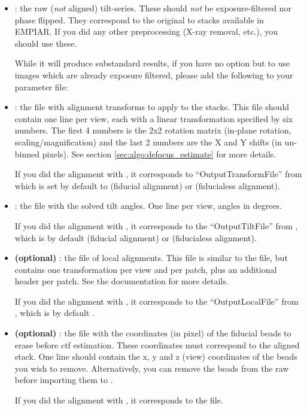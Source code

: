 \begin{itemize}
    \item {}: the raw (\textit{not} aligned) tilt-series. These should \textit{not} be exposure-filtered nor phase flipped. They correspond to the original  to  stacks available in EMPIAR. If you did any other preprocessing (X-ray removal, etc.), you should use these.
    
    \begin{note}While it will produce substandard results, if you have no option but to use images which are already exposure filtered, please add the following to your parameter file: 
    \end{note}
    
    \item {}: the file with alignment transforms to apply to the  stacks. This file should contain one line per view, each with a linear transformation specified by six numbers. The first 4 numbers is the 2x2 rotation matrix (in-plane rotation, scaling/magnification) and the last 2 numbers are the X and Y shifts (in un-binned pixels). See section \ref{sec:algo:defocus_estimate} for more details.
    
    If you did the alignment with {\ETomo}, it corresponds to ``OutputTransformFile'' from {\tiltalign} which is set by default to  (fiducial alignment) or  (fiducialess alignment).
    
    \item {}: the file with the solved tilt angles. One line per view, angles in degrees.
    
    If you did the alignment with {\ETomo}, it corresponds to the ``OutputTiltFile'' from {\tiltalign}, which is by default  (fiducial alignment) or  (fiducialess alignment).
    
    \item \textbf{(optional)} : the file of local alignments. This file is similar to the  file, but contains one transformation per view and per patch, plus an additional header per patch. See the {\tiltalign} documentation for more details.
    
    If you did the alignment with {\ETomo}, it corresponds to the ``OutputLocalFile'' from {\tiltalign}, which is by default .
    
    \item \textbf{(optional)} : the file with the coordinates (in pixel) of the fiducial beads to erase before ctf estimation. These coordinates must correspond to the aligned stack. One line should contain the x, y and z (view) coordinates of the beads you wish to remove. Alternatively, you can remove the beads from the raw  before importing them to {\emClarity}.
    
    If you did the alignment with {\ETomo}, it corresponds to the  file.
\end{itemize}

